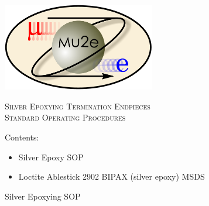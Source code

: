 \documentclass[letterpaper,12pt]{article}
\begin{document}
\begin{titlepage}
	\centering
	\includegraphics[width=0.5\textwidth]{mu2e_logo_oval}\par\vspace{2cm}
	{\scshape\LARGE Silver Epoxying Termination Endpieces \\
		Standard Operating Procedures\par}
	\vspace{3cm}

	{\large Contents:
	\begin{itemize}
	\item Silver Epoxy SOP
	\item Loctite Ablestick 2902 BIPAX (silver epoxy) MSDS
	\end{itemize}
	}
	
	
\end{titlepage}

\newpage
\medskip
{\Large Silver Epoxying SOP}
\end{document}
